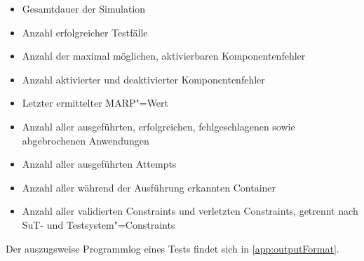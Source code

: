 \begin{itemize}
    \item Gesamtdauer der Simulation
    \item Anzahl erfolgreicher Testfälle
    \item Anzahl der maximal möglichen, aktivierbaren Komponentenfehler
    \item Anzahl aktivierter und deaktivierter Komponentenfehler
    \item Letzter ermittelter \gls{MARP}"=Wert
    \item Anzahl aller ausgeführten, erfolgreichen, fehlgeschlagenen sowie abgebrochenen Anwendungen
    \item Anzahl aller ausgeführten Attempts
    \item Anzahl aller während der Ausführung erkannten Container
    \item Anzahl aller validierten Constraints und verletzten Constraints, getrennt nach \gls{SuT}- und Testsystem"=Constraints
\end{itemize}

Der auszugsweise Programmlog eines Tests findet sich in \cref{app:outputFormat}.